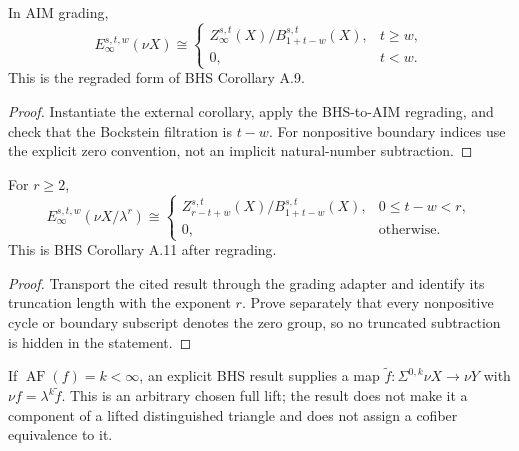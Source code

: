\begin{theorem}[$E_\infty$ of $\nu X$]
  \label{thm:external-synthetic-einfty-nu}
  \notready
  In AIM grading,
  \[
    E_\infty^{s,t,w}(\nu X)\cong
    \begin{cases}
      Z_\infty^{s,t}(X)/B_{1+t-w}^{s,t}(X),&t\ge w,\\
      0,&t<w.
    \end{cases}
  \]
  This is the regraded form of BHS Corollary A.9.
\end{theorem}

\begin{proof}
  Instantiate the external corollary, apply the BHS-to-AIM regrading, and
  check that the Bockstein filtration is $t-w$.  For nonpositive boundary
  indices use the explicit zero convention, not an implicit natural-number
  subtraction.
\end{proof}

\begin{theorem}
  \label{thm:external-synthetic-einfty-quotient}
  \notready
  For $r\ge2$,
  \[
    E_\infty^{s,t,w}(\nu X/\lambda^r)\cong
    \begin{cases}
      Z_{r-t+w}^{s,t}(X)/B_{1+t-w}^{s,t}(X),&0\le t-w<r,\\
      0,&\text{otherwise}.
    \end{cases}
  \]
  This is BHS Corollary A.11 after regrading.
\end{theorem}

\begin{proof}
  Transport the cited result through the grading adapter and identify its
  truncation length with the exponent $r$.  Prove separately that every
  nonpositive cycle or boundary subscript denotes the zero group, so no
  truncated subtraction is hidden in the statement.
\end{proof}

\begin{theorem}
  \label{thm:external-synthetic-lift}
  \notready
  If $\operatorname{AF}(f)=k<\infty$, an explicit BHS result supplies a map
  $\widetilde f:\Sigma^{0,k}\nu X\to\nu Y$ with
  $\nu f=\lambda^k\widetilde f$.  This is an arbitrary chosen full lift; the
  result does not make it a component of a lifted distinguished triangle and
  does not assign a cofiber equivalence to it.
\end{theorem}

